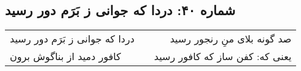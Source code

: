 \begin{center}
\section*{شماره ۴۰: دردا که جوانی ز بَرَم دور رسید}
\label{sec:040}
\begin{longtable}{l p{0.5cm} r}
دردا که جوانی ز بَرَم دور رسید
&&
صد گونه بلای منِ رنجور رسید
\\
کافور دمید از بناگوش برون
&&
یعنی که: کفن ساز که کافور رسید
\\
\end{longtable}
\end{center}

